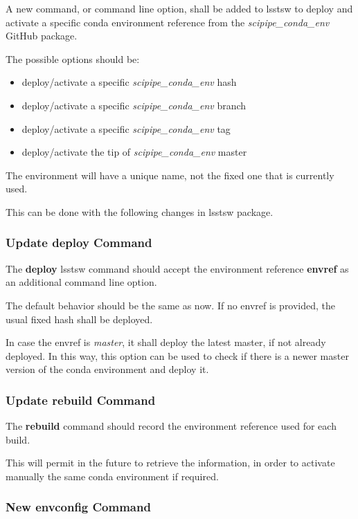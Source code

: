 A new command, or command line option, shall be added to lsstsw to deploy and activate a specific conda environment reference from the \textit{scipipe\_conda\_env} GitHub package.

The possible options should be:

\begin{itemize}
\item deploy/activate a specific \textit{scipipe\_conda\_env} hash
\item deploy/activate a specific \textit{scipipe\_conda\_env} branch
\item deploy/activate a specific \textit{scipipe\_conda\_env} tag
\item deploy/activate the tip of \textit{scipipe\_conda\_env} master
\end{itemize}

The environment will have a unique name, not the fixed one that is currently used.

This can be done with the following changes in lsstsw package.

\subsubsection{Update deploy Command} \label{sec:deploy}

The \textbf{deploy} lsstsw command should accept the environment reference \textbf{envref}  as an additional command line option.

The default behavior should be the same as now. If no envref is provided, the usual fixed hash shall be deployed. 

In case the envref is \textit{master}, it shall deploy the latest master, if not already deployed.
In this way, this option can be used to check if there is a newer master version of the conda environment and deploy it.


\subsubsection{Update rebuild Command} \label{sec:rebuild}

The \textbf{rebuild} command should record the environment reference used for each build.

This will permit in the future to retrieve the information, in order to activate manually the same conda environment if required.


\subsubsection{New envconfig Command} \label{sec:envconfig}

